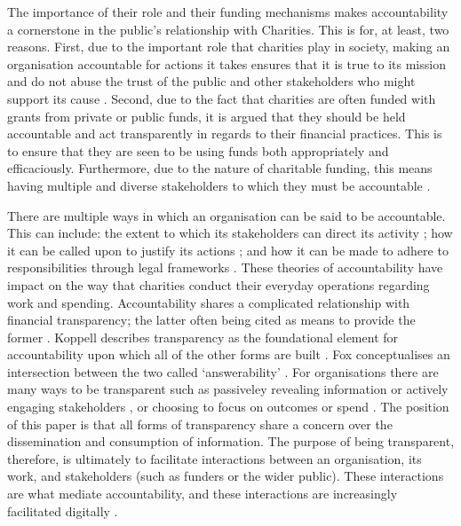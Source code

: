 The importance of their role and their funding mechanisms makes accountability a cornerstone in the public's relationship with Charities. This is for, at least, two reasons. First, due to the important role that charities play in society, making an organisation accountable for actions it takes ensures that it is true to its mission and do not abuse the trust of the public and other stakeholders who might support its cause \cite{frumkin_accountability_2006, jacobson_lifting_2005}. Second, due to the fact that charities are often funded with grants from private or public funds, it is argued that they should be held accountable and act transparently in regards to their financial practices. This is to ensure that they are seen to be using funds both appropriately and efficaciously. Furthermore, due to the nature of charitable funding, this means having multiple and diverse stakeholders to which they must be accountable \cite{krashinsky_stakeholder_1997, macmillan_relationship_2005}.

There are multiple ways in which an organisation can be said to be accountable. This can include: the extent to which its stakeholders can direct its activity \cite{koppell_pathologies_2005}; how it can be called upon to justify its actions \cite{fox_uncertain_2007}; and how it can be made to adhere to responsibilities through legal frameworks \cite{koppell_pathologies_2005}. These theories of accountability have impact on the way that charities conduct their everyday operations regarding work and spending. Accountability shares a complicated relationship with financial transparency; the latter often being cited as means to provide the former \cite{hood_accountability_2010}. Koppell describes transparency as the foundational element for accountability upon which all of the other forms are built \cite{koppell_pathologies_2005}. Fox conceptualises an intersection between the two called `answerability' \cite{fox_uncertain_2007}. For organisations there are many ways to be transparent such as passiveley revealing information or actively engaging stakeholders \cite{oliver_what_2004, schauer_transparency_2011}, or choosing to focus on outcomes or spend \cite{heald_varieties_2006}. The position of this paper is that all forms of transparency share a concern over the dissemination and consumption of information. The purpose of being transparent, therefore, is ultimately to facilitate interactions between an organisation, its work, and stakeholders (such as funders or the wider public). These interactions are what mediate accountability, and these interactions are increasingly facilitated digitally \cite{meijer_understanding_2009, oliver_what_2004}.


